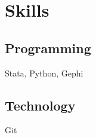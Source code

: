 \documentclass[]{deedy-resume-reversed}
\begin{document}
\begin{minipage}[t]{0.33\textwidth}

\section{Skills}
\subsection{Programming}
Stata, Python, Gephi
\sectionsep

\subsection{Technology}
Git
\sectionsep







\end{minipage}
\end{document}
